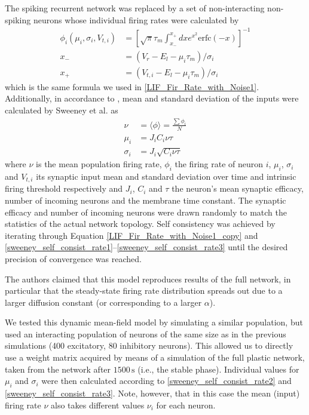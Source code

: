 \documentclass[10pt,a4paper]{article}
\begin{document}
The spiking recurrent network was replaced by a set of non-interacting non-spiking neurons whose individual firing rates were calculated by
\begin{align}
\phi_i(\mu_i,\sigma_i,V_{t,i}) &= \left[ \sqrt{\pi}\tau_m \int_{x_-}^{x_+} dx e^{x^2} \mathrm{erfc}(-x) \right]^{-1} \label{LIF_Fir_Rate_with_Noise1_copy}\\
x_- &= (V_r-E_l-\mu_i\tau_m)/\sigma_i \label{LIF_Fir_Rate_with_Noise2_copy}\\
x_+ &= (V_{t,i}-E_l-\mu_i\tau_m)/\sigma_i \label{LIF_Fir_Rate_with_Noise3_copy}
\end{align}
which is the same formula we used in \eqref{LIF_Fir_Rate_with_Noise1}. Additionally, in accordance to \cite{Roxin_Firing_Rate_Distribution}, mean and standard deviation of the inputs were calculated by Sweeney et al. as
\begin{align}
\nu &= \langle \phi \rangle = \frac{\sum \phi_i}{N} \label{sweeney_self_consist_rate1} \\
\mu_i &= J_iC_i\nu \tau \label{sweeney_self_consist_rate2} \\
\sigma_i &= J_i\sqrt{C_i\nu  \tau} \label{sweeney_self_consist_rate3}
\end{align}
where $\nu$ is the mean population firing rate, $\phi_i$ the firing rate of neuron $i$, $\mu_i$, $\sigma_i$ and $V_{t,i}$ its synaptic input mean and standard deviation over time and intrinsic firing threshold respectively and $J_i$, $C_i$ and $\tau$ the neuron's mean synaptic efficacy, number of incoming neurons and the membrane time constant. The synaptic efficacy and number of incoming neurons were drawn randomly to match the statistics of the actual network topology. Self consistency was achieved by iterating through Equation \eqref{LIF_Fir_Rate_with_Noise1_copy} and \eqref{sweeney_self_consist_rate1}--\eqref{sweeney_self_consist_rate3} until the desired precision of convergence was reached.

The authors claimed that this model reproduces results of the full network, in particular that the steady-state firing rate distribution spreads out due to a larger diffusion constant (or corresponding to a larger $\alpha$).

We tested this dynamic mean-field model by simulating a similar population, but used an interacting population of neurons of the same size as in the previous simulations (400 excitatory, 80 inhibitory neurons). This allowed us to directly use a weight matrix acquired by means of a simulation of the full plastic network, taken from the network after $\mathrm{1500 \, s}$ (i.e., the stable phase).
Individual values for $\mu_i$ and $\sigma_i$ were then calculated according to \eqref{sweeney_self_consist_rate2} and \eqref{sweeney_self_consist_rate3}. Note, however, that in this case the mean (input) firing rate $\nu$ also takes different values $\nu_i$ for each neuron.
\end{document}
